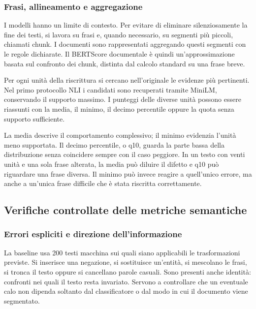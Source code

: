 \subsubsection{Frasi, allineamento e aggregazione}\label{frasi-allineamento-e-aggregazione}

I modelli hanno un limite di contesto. Per evitare di eliminare silenziosamente la fine dei testi, si lavora su frasi e, quando necessario, su segmenti più piccoli, chiamati chunk. I documenti sono rappresentati aggregando questi segmenti con le regole dichiarate. Il BERTScore documentale è quindi un'approssimazione basata sul confronto dei chunk, distinta dal calcolo standard su una frase breve.

Per ogni unità della riscrittura si cercano nell'originale le evidenze più pertinenti. Nel primo protocollo NLI i candidati sono recuperati tramite MiniLM, conservando il supporto massimo. I punteggi delle diverse unità possono essere riassunti con la media, il minimo, il decimo percentile oppure la quota senza supporto sufficiente.

La media descrive il comportamento complessivo; il minimo evidenzia l'unità meno supportata. Il decimo percentile, o q10, guarda la parte bassa della distribuzione senza coincidere sempre con il caso peggiore. In un testo con venti unità e una sola frase alterata, la media può diluire il difetto e q10 può riguardare una frase diversa. Il minimo può invece reagire a quell'unico errore, ma anche a un'unica frase difficile che è stata riscritta correttamente.

\subsection{Verifiche controllate delle metriche semantiche}\label{verifiche-controllate-delle-metriche-semantiche}

\subsubsection{Errori espliciti e direzione dell'informazione}\label{errori-espliciti-e-direzione-dellinformazione}

La baseline usa 200 testi macchina sui quali siano applicabili le trasformazioni previste. Si inserisce una negazione, si sostituisce un'entità, si mescolano le frasi, si tronca il testo oppure si cancellano parole casuali. Sono presenti anche identità: confronti nei quali il testo resta invariato. Servono a controllare che un eventuale calo non dipenda soltanto dal classificatore o dal modo in cui il documento viene segmentato.

